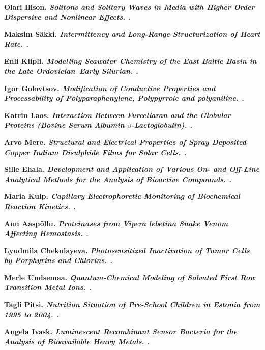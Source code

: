 \begin{list}
\item \bf Olari Ilison. \it Solitons and Solitary Waves in Media with Higher
  Order Dispersive and Nonlinear Effects. .

\item \bf Maksim S\"akki. \it Intermittency and Long-Range Structurization of
  Heart Rate. .

\item \bf Enli Kiipli. \it Modelling Seawater Chemistry of the East Baltic
  Basin in the Late Ordovician–Early Silurian. .

\item \bf Igor Golovtsov. \it Modification of Conductive Properties and
  Processability of Polyparaphenylene, Polypyrrole and
  polyaniline. .

\item \bf Katrin Laos. \it Interaction Between Furcellaran and the Globular
  Proteins (Bovine Serum Albumin $\beta$-Lactoglobulin). .

\item \bf Arvo Mere. \it Structural and Electrical Properties of Spray
  Deposited Copper Indium Disulphide Films for Solar Cells. .

\item \bf Sille Ehala. \it Development and Application of Various On- and
  Off-Line Analytical Methods for the Analysis of Bioactive
  Compounds. .

\item \bf Maria Kulp. \it Capillary Electrophoretic Monitoring of Biochemical
  Reaction Kinetics. .

\item \bf Anu Aasp\~ollu. \it Proteinases from Vipera lebetina Snake Venom
  Affecting Hemostasis. .

\item \bf Lyudmila Chekulayeva. \it Photosensitized Inactivation of Tumor
  Cells by Porphyrins and Chlorins. .

\item \bf Merle Uudsemaa. \it Quantum-Chemical Modeling of Solvated First Row
  Transition Metal Ions. .

\item \bf Tagli Pitsi. \it Nutrition Situation of Pre-School Children in
  Estonia from 1995 to 2004. .

\item \bf Angela Ivask. \it Luminescent Recombinant Sensor Bacteria for the
  Analysis of Bioavailable Heavy Metals. .


\end{list}
